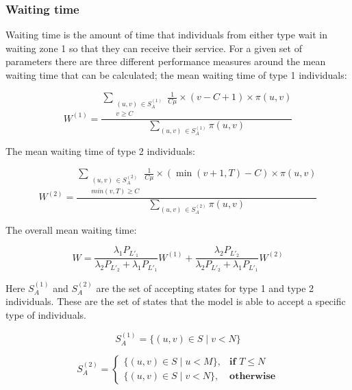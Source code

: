 \subsubsection{Waiting time} \label{sec:waiting_time}

Waiting time is the amount of time that individuals from either type wait in 
waiting zone 1 so that they can receive their service. 
For a given set of parameters there are three different performance measures 
around the mean waiting time that can be calculated; the mean waiting time of
type 1 individuals:

\begin{equation} \label{eq:closed_form_waiting_type_1}
    W^{(1)} = \frac{\sum_{\substack{(u,v) \, \in S_A^{(1)} \\ v \geq C}} 
    \frac{1}{C \mu} \times (v-C+1) \times \pi(u,v)}{\sum_{(u,v) \, 
    \in S_A^{(1)}} \pi(u,v)}
\end{equation}

The mean waiting time of type 2 individuals:

\begin{equation}\label{eq:closed_form_waiting_type_2}
    W^{(2)} = \frac{\sum_{\substack{(u,v) \, \in S_A^{(2)} \\ min(v,T) \geq C}} 
    \frac{1}{C \mu} \times (\min(v+1,T)-C) \times \pi(u,v)}{\sum_{(u,v) \, 
    \in S_A^{(2)}} \pi(u,v)}
\end{equation} 

The overall mean waiting time:

\begin{equation}\label{eq:overall_waiting_time}
    W = \frac{\lambda_1 P_{L'_1}}{\lambda_2 P_{L'_2} + \lambda_1 P_{L'_1}} W^{(1)} 
    + \frac{\lambda_2 P_{L'_2}}{\lambda_2 P_{L'_2} + \lambda_1 P_{L'_1}} W^{(2)}
\end{equation}
 
Here \(S_A^{(1)}\) and \(S_A^{(2)}\) are the set of accepting states for type
1 and type 2 individuals. These are the set of states that the model is able
to accept a specific type of individuals.

\begin{equation}\label{eq:accepting_states_type_1}
    S_A^{(1)} = \{(u, v) \in S \; | \; v < N \}
\end{equation}

\begin{equation}\label{eq:accepting_states_type_2}
    S_A^{(2)}=
    \begin{cases}
        \{(u, v) \in S \; | \; u < M \}, & \textbf{if } T \leq N\\
        \{(u, v) \in S \; | \; v < N \}, & \textbf{otherwise}
    \end{cases}
\end{equation}

